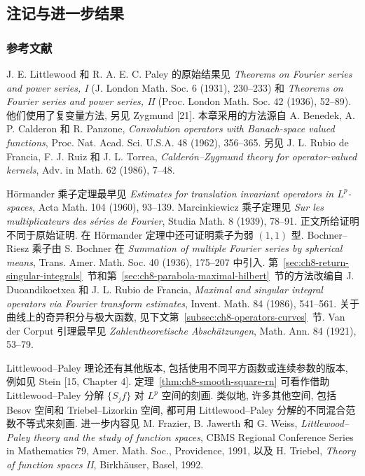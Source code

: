 \subsection{注记与进一步结果}
\label{sec:ch8-notes-further-results}

\subsubsection{参考文献}
\label{subsec:ch8-references}

J. E. Littlewood 和 R. A. E. C. Paley 的原始结果见 \textit{Theorems on Fourier series and power series, I} (J. London Math. Soc. 6 (1931), 230--233) 和 \textit{Theorems on Fourier series and power series, II} (Proc. London Math. Soc. 42 (1936), 52--89). 他们使用了复变量方法, 另见 Zygmund [21]. 本章采用的方法源自 A. Benedek, A. P. Calderon 和 R. Panzone, \textit{Convolution operators with Banach-space valued functions}, Proc. Nat. Acad. Sci. U.S.A. 48 (1962), 356--365. 另见 J. L. Rubio de Francia, F. J. Ruiz 和 J. L. Torrea, \textit{Calderón--Zygmund theory for operator-valued kernels}, Adv. in Math. 62 (1986), 7--48.

Hörmander 乘子定理最早见 \textit{Estimates for translation invariant operators in $L^p$-spaces}, Acta Math. 104 (1960), 93--139. Marcinkiewicz 乘子定理见 \textit{Sur les multiplicateurs des séries de Fourier}, Studia Math. 8 (1939), 78--91. 正文所给证明不同于原始证明. 在 Hörmander 定理中还可证明乘子为弱 $(1,1)$ 型. Bochner--Riesz 乘子由 S. Bochner 在 \textit{Summation of multiple Fourier series by spherical means}, Trans. Amer. Math. Soc. 40 (1936), 175--207 中引入. 第~\ref{sec:ch8-return-singular-integrals}~节和第~\ref{sec:ch8-parabola-maximal-hilbert}~节的方法改编自 J. Duoandikoetxea 和 J. L. Rubio de Francia, \textit{Maximal and singular integral operators via Fourier transform estimates}, Invent. Math. 84 (1986), 541--561. 关于曲线上的奇异积分与极大函数, 见下文第~\ref{subsec:ch8-operators-curves}~节. Van der Corput 引理最早见 \textit{Zahlentheoretische Abschätzungen}, Math. Ann. 84 (1921), 53--79.

Littlewood--Paley 理论还有其他版本, 包括使用不同平方函数或连续参数的版本, 例如见 Stein [15, Chapter 4]. 定理~\ref{thm:ch8-smooth-square-rn} 可看作借助 Littlewood--Paley 分解 $\{S_jf\}$ 对 $L^p$ 空间的刻画. 类似地, 许多其他空间, 包括 Besov 空间和 Triebel--Lizorkin 空间, 都可用 Littlewood--Paley 分解的不同混合范数不等式来刻画. 进一步内容见 M. Frazier, B. Jawerth 和 G. Weiss, \textit{Littlewood--Paley theory and the study of function spaces}, CBMS Regional Conference Series in Mathematics 79, Amer. Math. Soc., Providence, 1991, 以及 H. Triebel, \textit{Theory of function spaces II}, Birkhäuser, Basel, 1992.

